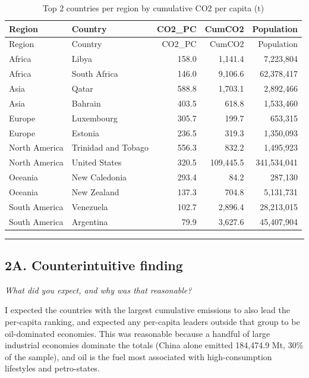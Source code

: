 \documentclass[
]{article}
\begin{document}
\begin{longtable}[]{@{}llrrr@{}}
\caption{Top 2 countries per region by cumulative CO2 per capita
(t)}\tabularnewline
\toprule\noalign{}
Region & Country & CO2\_PC & CumCO2 & Population \\
\midrule\noalign{}
\endfirsthead
\toprule\noalign{}
Region & Country & CO2\_PC & CumCO2 & Population \\
\midrule\noalign{}
\endhead
\bottomrule\noalign{}
\endlastfoot
Africa & Libya & 158.0 & 1,141.4 & 7,223,804 \\
Africa & South Africa & 146.0 & 9,106.6 & 62,378,417 \\
Asia & Qatar & 588.8 & 1,703.1 & 2,892,466 \\
Asia & Bahrain & 403.5 & 618.8 & 1,533,460 \\
Europe & Luxembourg & 305.7 & 199.7 & 653,315 \\
Europe & Estonia & 236.5 & 319.3 & 1,350,093 \\
North America & Trinidad and Tobago & 556.3 & 832.2 & 1,495,923 \\
North America & United States & 320.5 & 109,445.5 & 341,534,041 \\
Oceania & New Caledonia & 293.4 & 84.2 & 287,130 \\
Oceania & New Zealand & 137.3 & 704.8 & 5,131,731 \\
South America & Venezuela & 102.7 & 2,896.4 & 28,213,015 \\
South America & Argentina & 79.9 & 3,627.6 & 45,407,904 \\
\end{longtable}

\begin{center}\rule{0.5\linewidth}{0.5pt}\end{center}

\subsection{2A. Counterintuitive
finding}\label{a.-counterintuitive-finding}

\emph{What did you expect, and why was that reasonable?}

I expected the countries with the largest cumulative emissions to also
lead the per-capita ranking, and expected any per-capita leaders outside
that group to be oil-dominated economies. This was reasonable because a
handful of large industrial economies dominate the totals (China alone
emitted 184,474.9 Mt, 30\% of the sample), and oil is the fuel most
associated with high-consumption lifestyles and petro-states.
\end{document}
